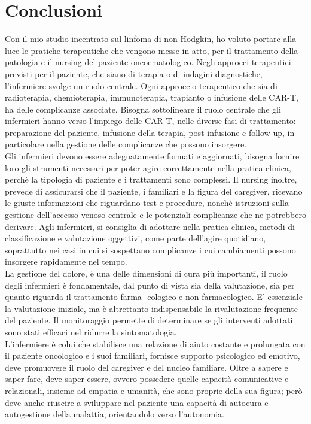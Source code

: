 \section*{Conclusioni}

Con il mio studio incentrato sul linfoma di non-Hodgkin, ho voluto portare alla luce le pratiche terapeutiche 
che vengono messe in atto, per il trattamento della patologia e il nursing del paziente oncoematologico. 
Negli approcci terapeutici previsti per il paziente, che siano di terapia o di indagini diagnostiche, l'infermiere 
svolge un ruolo centrale.
Ogni approccio terapeutico che sia di radioterapia, chemioterapia, immunoterapia, trapianto o infusione delle CAR-T, 
ha delle complicanze associate. Bisogna sottolineare il ruolo centrale che gli infermieri hanno 
verso l’impiego delle CAR-T, nelle diverse fasi di trattamento: preparazione del paziente, infusione della terapia, 
post-infusione e follow-up, in particolare nella gestione delle complicanze che possono insorgere.\\
Gli infermieri devono essere adeguatamente formati e aggiornati, bisogna fornire loro gli strumenti necessari per poter 
agire correttamente nella pratica clinica, perchè la tipologia di paziente e i trattamenti sono complessi. 
Il nursing inoltre, prevede di assicurarsi che il paziente, i familiari e la figura del caregiver, ricevano le 
giuste informazioni che riguardano test e procedure, nonchè istruzioni sulla gestione dell’accesso venoso centrale e le
potenziali complicanze che ne potrebbero derivare.
Agli infermieri, si consiglia di adottare nella pratica clinica, metodi di classificazione e valutazione oggettivi, 
come parte dell’agire quotidiano, soprattutto nei casi in cui si sospettano complicanze i
cui cambiamenti possono insorgere rapidamente nel tempo.\\
La gestione del dolore, è una delle dimensioni di cura più importanti, il ruolo degli infermieri è
fondamentale, dal punto di vista sia della valutazione, sia per quanto riguarda il trattamento farma-
cologico e non farmacologico. 
E' essenziale la valutazione iniziale, ma è altrettanto indispensabile la rivalutazione
frequente del paziente. Il monitoraggio permette di determinare se gli interventi adottati sono stati
efficaci nel ridurre la sintomatologia.\\
L’infermiere è colui che stabilisce una relazione di aiuto costante e prolungata con il paziente 
oncologico e i suoi familiari, fornisce supporto psicologico ed emotivo, deve promuovere il ruolo del
caregiver e del nucleo familiare. Oltre a sapere e saper fare, deve saper essere, ovvero possedere quelle 
capacità comunicative e relazionali, insieme ad empatia e umanità, che sono proprie della sua figura;
però deve anche riuscire a sviluppare nel paziente una capacità di autocura e autogestione della malattia, 
orientandolo verso l’autonomia.
